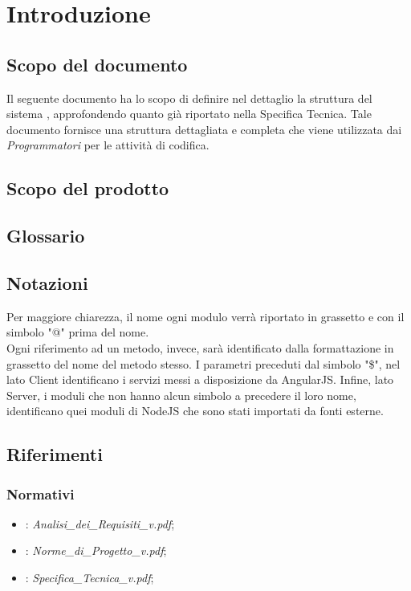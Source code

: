 \newpage
\tableofcontents

\newpage
\listoffigures %

\newpage
\section{Introduzione}
\subsection{Scopo del documento}
Il seguente documento ha lo scopo di definire nel dettaglio la struttura del sistema , approfondendo quanto già riportato nella Specifica Tecnica. Tale documento fornisce una struttura dettagliata e completa che viene utilizzata dai \emph{Programmatori} per le attività di codifica. 

\subsection{Scopo del prodotto}
\Prodotto{}

\subsection{Glossario}
\Glossario{}

\subsection{Notazioni}
Per maggiore chiarezza, il nome ogni modulo verrà riportato in grassetto e con il simbolo "@" prima del nome.\\
Ogni riferimento ad un metodo, invece, sarà identificato dalla formattazione in grassetto del nome del metodo stesso. 
I parametri preceduti dal simbolo "\$", nel lato Client identificano i servizi messi a disposizione da AngularJS. Infine, lato Server, i moduli che non hanno alcun simbolo a precedere il loro nome, identificano quei moduli di NodeJS che sono stati importati da fonti esterne.

\subsection{Riferimenti}

\subsubsection{Normativi}
\begin{itemize}
\item {}: \emph{Analisi\_{}dei\_{}Requisiti\_{}v\versioneAnalisiDeiRequisiti{}.pdf};
\item {}: \emph{Norme\_{}di\_{}Progetto\_{}v\versioneNormeDiProgetto{}.pdf};
\item {}: \emph{Specifica\_{}Tecnica\_{}v\versioneNormeDiProgetto{}.pdf};
\end{itemize}

